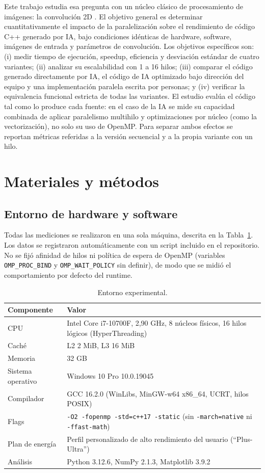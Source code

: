 \documentclass[12pt]{article}
\newcommand{\fuente}{\par\vspace{2pt}{\footnotesize Fuente: elaboración propia.}}
\begin{document}
Este trabajo estudia esa pregunta con un núcleo clásico de procesamiento de imágenes: la convolución 2D \cite{gonzalez2018}. El objetivo general es determinar cuantitativamente el impacto de la paralelización sobre el rendimiento de código C++ generado por IA, bajo condiciones idénticas de hardware, software, imágenes de entrada y parámetros de convolución. Los objetivos específicos son: (i) medir tiempo de ejecución, speedup, eficiencia y desviación estándar de cuatro variantes; (ii) analizar su escalabilidad con 1 a 16 hilos; (iii) comparar el código generado directamente por IA, el código de IA optimizado bajo dirección del equipo y una implementación paralela escrita por personas; y (iv) verificar la equivalencia funcional estricta de todas las variantes. El estudio evalúa el código tal como lo produce cada fuente: en el caso de la IA se mide su capacidad combinada de aplicar paralelismo multihilo y optimizaciones por núcleo (como la vectorización), no solo su uso de OpenMP. Para separar ambos efectos se reportan métricas referidas a la versión secuencial y a la propia variante con un hilo.

\section{Materiales y métodos}

\subsection{Entorno de hardware y software}
Todas las mediciones se realizaron en una sola máquina, descrita en la Tabla~\ref{tab:entorno}. Los datos se registraron automáticamente con un script incluido en el repositorio. No se fijó afinidad de hilos ni política de espera de OpenMP (variables \texttt{OMP\_PROC\_BIND} y \texttt{OMP\_WAIT\_POLICY} sin definir), de modo que se midió el comportamiento por defecto del runtime.

\begin{table}[H]
\centering
\caption{Entorno experimental.}
\label{tab:entorno}
\begin{tabular}{lp{11cm}}
\toprule
Componente & Valor \\
\midrule
CPU & Intel Core i7-10700F, 2,90 GHz, 8 núcleos físicos, 16 hilos lógicos (HyperThreading) \\
Caché & L2 2 MiB, L3 16 MiB \\
Memoria & 32 GB \\
Sistema operativo & Windows 10 Pro 10.0.19045 \\
Compilador & GCC 16.2.0 (WinLibs, MinGW-w64 x86\_64, UCRT, hilos POSIX) \cite{gccdoc} \\
Flags & \texttt{-O2 -fopenmp -std=c++17 -static} (sin \texttt{-march=native} ni \texttt{-ffast-math}) \\
Plan de energía & Perfil personalizado de alto rendimiento del usuario (``Plus-Ultra'') \\
Análisis & Python 3.12.6, NumPy 2.1.3, Matplotlib 3.9.2 \\
\bottomrule
\end{tabular}
\fuente
\end{table}
\end{document}

